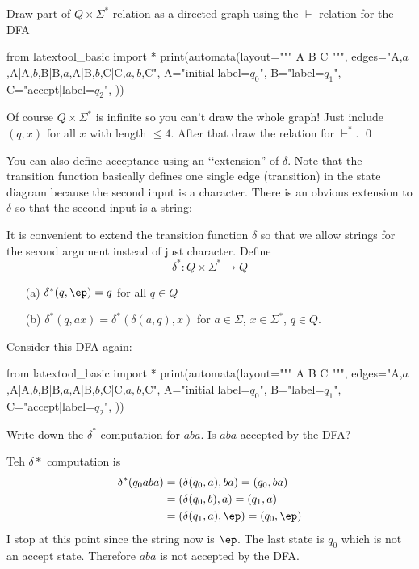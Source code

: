 \newpage
\begin{ex}
  Draw part of $Q \times \Sigma^*$ relation as a directed graph
  using the $\vdash$ relation for the DFA
\begin{python}
from latextool_basic import *
print(automata(layout="""
A  B  C
""",
edges="A,$a$,A|A,$b$,B|B,$a$,A|B,$b$,C|C,$a,b$,C",
A="initial|label=$q_0$",
B="label=$q_1$",
C="accept|label=$q_2$",
))
\end{python}
Of course $Q \times \Sigma^*$ is infinite so you can't
draw the whole graph!
Just include $(q, x)$ for all $x$ with length $\leq 4$.
After that draw the relation for $\vdash^*$.
\qed
\end{ex}



\newpage
You can also define acceptance using an \lq\lq extension'' of $\delta$.
Note that the transition function basically defines one single
edge (transition) in the state diagram because the second input is a
character.
There is an obvious extension to $\delta$ so that the second
input is a string:

\begin{defn}
It is convenient to extend the transition function $\delta$ so that
we allow strings for the second argument instead of just character.
Define
\[
 \delta^* : Q \times \Sigma^* \rightarrow Q
\]
\begin{itemize}
 \item[(a)] $\delta^*(q, \ep) = q$ for all $q \in Q$
 \item[(b)] $\delta^*(q, ax) = \delta^*( \delta(a,q), x)$ for $a \in
 \Sigma$, $x \in \Sigma^*$, $q \in Q$.
\end{itemize}
\end{defn}


\newpage
\begin{eg} Consider this DFA again:
  \begin{python}
from latextool_basic import *
print(automata(layout="""
A  B  C
""",
edges="A,$a$,A|A,$b$,B|B,$a$,A|B,$b$,C|C,$a,b$,C",
A="initial|label=$q_0$",
B="label=$q_1$",
C="accept|label=$q_2$",
))
  \end{python}
  Write down the $\delta^*$
  computation for $aba$. Is $aba$ accepted by the DFA?
  \end{eg}

  \SOLUTION
  Teh $\delta*$ computation is
  \begin{align*}
    \delta^*(q_0 aba)
    &= (\delta(q_0, a), ba) = (q_0, ba) \\
    &= (\delta(q_0, b), a) = (q_1, a) \\
    &= (\delta(q_1, a), \ep) = (q_0, \ep)
  \end{align*}
  I stop at this point since the string now is $\ep$.
  The last state is $q_0$ which is not an accept state.
  Therefore
  $aba$ is not accepted by the DFA.

